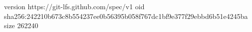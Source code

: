 version https://git-lfs.github.com/spec/v1
oid sha256:242210b673c8b554237ee0b56395b058f767dc1bf9e377f29ebbd6b51e4245ba
size 262240
